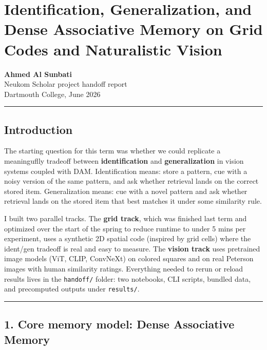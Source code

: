 \documentclass[
  11pt,
]{memoir}
\author{}
\date{}
\begin{document}
\frontmatter

\mainmatter
\chapter{Identification, Generalization, and Dense Associative Memory on
Grid Codes and Naturalistic
Vision}\label{identification-generalization-and-dense-associative-memory-on-grid-codes-and-naturalistic-vision}

\textbf{Ahmed Al Sunbati}\\
Neukom Scholar project handoff report\\
Dartmouth College, June 2026

\begin{center}\rule{0.5\linewidth}{0.5pt}\end{center}

\section{Introduction}\label{introduction}

The starting question for this term was whether we could replicate a
meaninguflly tradeoff between \textbf{identification} and
\textbf{generalization} in vision systems coupled with DAM.
Identification means: store a pattern, cue with a noisy version of the
same pattern, and ask whether retrieval lands on the correct stored
item. Generalization means: cue with a novel pattern and ask whether
retrieval lands on the stored item that best matches it under some
similarity rule.

I built two parallel tracks. The \textbf{grid track}, which was finished
last term and optimized over the start of the spring to reduce runtime
to under 5 mins per experiment, uses a synthetic 2D spatial code
(inspired by grid cells) where the ident/gen tradeoff is real and easy
to measure. The \textbf{vision track} uses pretrained image models (ViT,
CLIP, ConvNeXt) on colored squares and on real Peterson images with
human similarity ratings. Everything needed to rerun or reload results
lives in the \texttt{handoff/} folder: two notebooks, CLI scripts,
bundled data, and precomputed outputs under \texttt{results/}.

\begin{center}\rule{0.5\linewidth}{0.5pt}\end{center}

\section{1. Core memory model: Dense Associative
Memory}\label{core-memory-model-dense-associative-memory}
\end{document}
